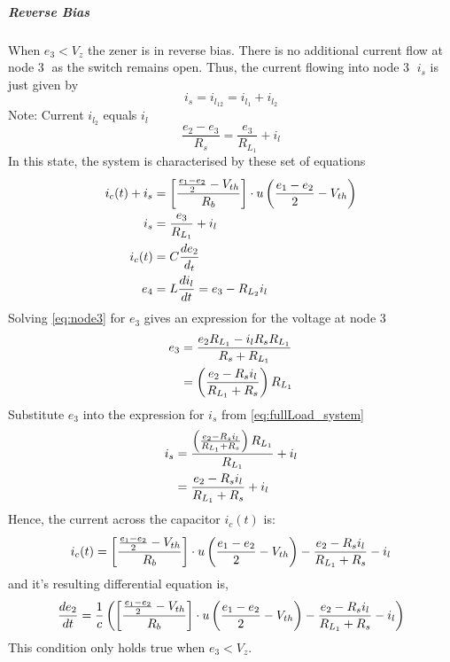 \subparagraph{Reverse Bias}
When $e_3 < V_z$ the zener is in reverse bias. There is no additional current flow at node \textcircled{3} as the switch remains open. Thus, the current flowing into node \textcircled{3} $i_s$ is just given by $$i_s = i_{l_{12}} = i_{l_1} + i_{l_2}$$
Note: Current $i_{l_2}$ equals $i_l$
\begin{equation}
	\frac{e_2 - e_3}{R_s} = \frac{e_3}{R_{L_1}} + i_l
	\label{eq:node3}
\end{equation}
In this state, the system is characterised by these set of equations
\begin{align}
	i_c(t) + i_s &= \left[\frac{\frac{e_1 - e_2}{2} - V_{th}}{R_b} \right]\cdot u\left(\frac{e_1 - e_2}{2} - V_{th} \right) \\
	i_s &= \frac{e_3}{R_{L_1}} + i_l \\
	i_c(t) &= C \frac{de_2}{d_t} \\
	e_4 &= L\frac{di_l}{dt} = e_3 - R_{L_2}i_l
	\label{eq:fullLoad_system}
\end{align}
Solving \eqref{eq:node3} for $e_3$ gives an expression for the voltage at node \textcircled{3}
\begin{equation}
\begin{split}
	e_3 &= \frac{e_2R_{L_1} - i_l R_s R_{L_1}}{R_s + R_{L_1}} \\
	    &= \left(\frac{e_2 - R_s i_l}{R_{L_1} + R_s} \right)R_{L_1}
\end{split}
\label{eq:e3_il}
\end{equation}
Substitute $e_3$ into the expression for $i_s$ from \eqref{eq:fullLoad_system}
\begin{equation}
 \begin{split}
	i_s &= \frac{\left(\frac{e_2 - R_s i_l}{R_{L_1} + R_s} \right)R_{L_1}}{R_{L_1}} + i_l \\
		&= \frac{e_2 - R_s i_l}{R_{L_1} + R_s} + i_l
 \end{split}
\end{equation}
Hence, the current across the capacitor $i_c(t)$ is:
\begin{equation}
	i_c(t) = \left[\frac{\frac{e_1 - e_2}{2} - V_{th}}{R_b} \right]\cdot u\left(\frac{e_1 - e_2}{2} - V_{th} \right) - \frac{e_2 - R_s i_l}{R_{L_1} + R_s} - i_l
\end{equation}
and it's resulting differential equation is,
\begin{equation}
	\frac{de_2}{dt} = \frac{1}{c}\left(\left[\frac{\frac{e_1 - e_2}{2} - V_{th}}{R_b} \right]\cdot u\left(\frac{e_1 - e_2}{2} - V_{th} \right) - \frac{e_2 - R_s i_l}{R_{L_1} + R_s} - i_l \right)
	\label{eq:fullLoad_DiffEq1}
\end{equation}
This condition only holds true when $e_3 < V_z$.

